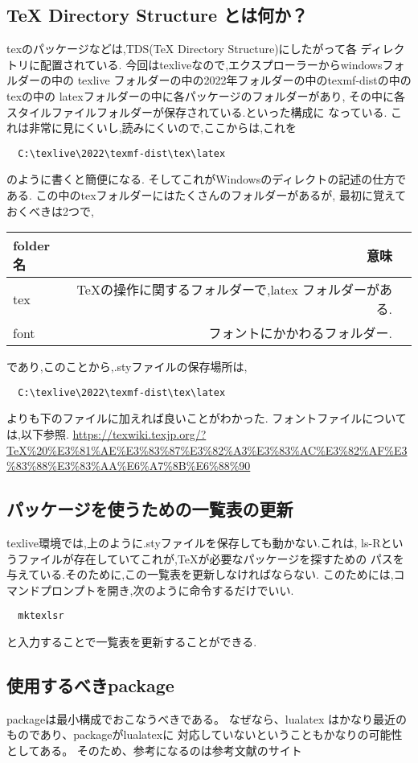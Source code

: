 \documentclass{ltjsarticle}
\begin{document}
\subsection{TeX Directory Structure とは何か？}
texのパッケージなどは,TDS(TeX Directory Structure)にしたがって各
ディレクトリに配置されている.
今回はtexliveなので,エクスプローラーからwindowsフォルダーの中の
texlive フォルダーの中の2022年フォルダーの中のtexmf-distの中のtexの中の
latexフォルダーの中に各パッケージのフォルダーがあり,
その中に各スタイルファイルフォルダーが保存されている.といった構成に
なっている.
これは非常に見にくいし,読みにくいので,ここからは,これを
\begin{verbatim}
  C:\texlive\2022\texmf-dist\tex\latex
\end{verbatim}
のように書くと簡便になる.
そしてこれがWindowsのディレクトの記述の仕方である.
この中のtexフォルダーにはたくさんのフォルダーがあるが,
最初に覚えておくべきは2つで,
\begin{center}
  \begin{tabular}{lrr} \hline
    folder名 & 意味                               \\ \hline
    tex     & TeXの操作に関するフォルダーで,latex フォルダーがある. \\
    font    & フォントにかかわるフォルダー.                  \\ \hline
  \end{tabular}
\end{center}
であり,このことから,.styファイルの保存場所は,
\begin{verbatim}
  C:\texlive\2022\texmf-dist\tex\latex
\end{verbatim}
よりも下のファイルに加えれば良いことがわかった.
フォントファイルについては,以下参照.
\url{https://texwiki.texjp.org/?TeX%20%E3%81%AE%E3%83%87%E3%82%A3%E3%83%AC%E3%82%AF%E3%83%88%E3%83%AA%E6%A7%8B%E6%88%90}
\subsection{パッケージを使うための一覧表の更新}
texlive環境では,上のように.styファイルを保存しても動かない.これは,
ls-Rというファイルが存在していてこれが,TeXが必要なパッケージを探すための
パスを与えている.そのために,この一覧表を更新しなければならない.
このためには,コマンドプロンプトを開き,次のように命令するだけでいい.
\begin{verbatim}
  mktexlsr
\end{verbatim}
と入力することで一覧表を更新することができる.
\subsection{使用するべきpackage}
packageは最小構成でおこなうべきである。
なぜなら、lualatex  はかなり最近のものであり、packageがlualatexに
対応していないということもかなりの可能性としてある。
そのため、参考になるのは参考文献のサイト
\end{document}

